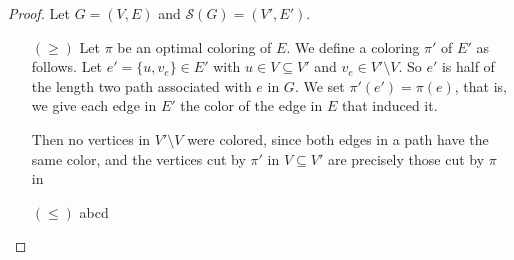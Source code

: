 \documentclass{article}
\begin{document}
	\begin{proof}
		Let $G = (V, E)$ and $\mathcal{S}(G) = (V', E')$.
		\begin{enumerate}
			\item[$(\geq)$] Let $\pi$ be an optimal coloring of $E$. We define
					a coloring $\pi'$ of $E'$ as follows. Let
					$e' = \{u, v_e\} \in E'$ with $u \in V \subseteq V'$ and
					$v_e \in V' \setminus V$. So $e'$ is half of the length two
					path associated with $e$ in $G$. We set
					$\pi'(e') = \pi(e)$, that is, we give each edge in $E'$ the
					color of the edge in $E$ that induced it.

					Then no vertices in $V'\setminus V$ were colored, since
					both edges in a path have the same color, and the vertices
					cut by $\pi'$ in $V \subseteq V'$ are precisely those
					cut by $\pi$ in 
			\item[$(\leq)$] abcd
		\end{enumerate}
	\end{proof}
\end{document}
